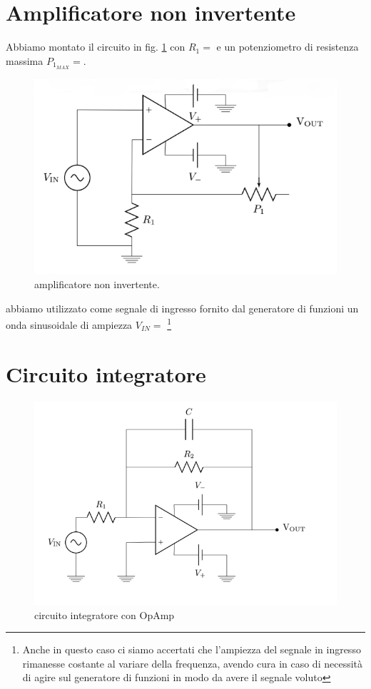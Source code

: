 \documentclass[10pt,a4paper]{article}
\begin{document}
\section{Amplificatore non invertente}
Abbiamo montato il circuito in fig. \ref{opampnoninvert} con $R_1=$ e  un potenziometro di resistenza massima $P_{1_{MAX}}=$.
\begin{figure}[!htb]
  \centering
  \includegraphics[scale=0.5]{opampnoninvert.png}
\caption{amplificatore non invertente.}
\label{opampnoninvert}
\end{figure}

abbiamo utilizzato come segnale di ingresso fornito dal generatore di funzioni  un onda sinusoidale di ampiezza $V_{IN}=$ \footnote{Anche in questo caso  ci siamo accertati che l'ampiezza del segnale in ingresso rimanesse costante al variare della frequenza, avendo cura in caso di necessità di agire sul generatore di funzioni in modo da avere il segnale voluto} 
\section{Circuito integratore}
\begin{figure}[!htb]
  \centering
  \includegraphics[scale=0.5]{integratore.png}
\caption{circuito integratore con OpAmp}
\end{figure}
\end{document}
